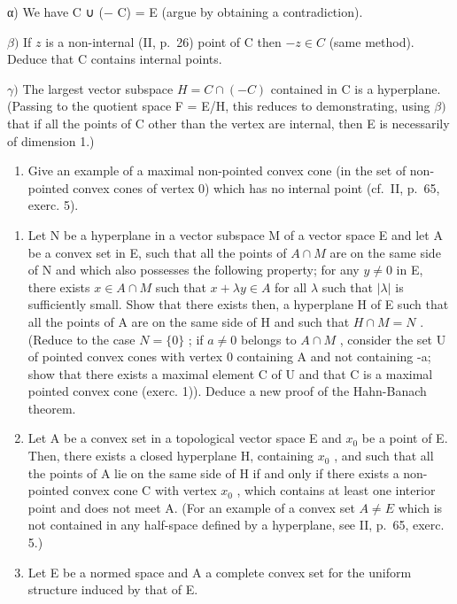 α) We have C ∪ (− C) = E (argue by obtaining a contradiction).

\(\beta)\) If \(z\) is a non-internal (II, p.~26) point of C then \(-z \in C\) (same method). Deduce that C contains internal points.

\(\gamma)\) The largest vector subspace \(H = C \cap (-C)\) contained in C is a hyperplane. (Passing to the quotient space F = E/H, this reduces to demonstrating, using \(\beta)\) that if all the points of C other than the vertex are internal, then E is necessarily of dimension 1.)

\begin{enumerate}
\def\labelenumi{\alph{enumi})}
\setcounter{enumi}{1}
\tightlist
\item
  Give an example of a maximal non-pointed convex cone (in the set of non-pointed convex cones of vertex 0) which has no internal point (cf.~II, p.~65, exerc. 5).
\end{enumerate}

\begin{enumerate}
\def\labelenumi{\arabic{enumi})}
\setcounter{enumi}{1}
\item
  Let N be a hyperplane in a vector subspace M of a vector space E and let A be a convex set in E, such that all the points of \(A \cap M\) are on the same side of N and which also possesses the following property; for any \(y \neq 0\) in E, there exists \(x \in A \cap M\) such that \(x + \lambda y \in A\) for all \(\lambda\) such that \(|\lambda|\) is sufficiently small. Show that there exists then, a hyperplane H of E such that all the points of A are on the same side of H and such that \(H \cap M = N\) . (Reduce to the case \(N = \{0\}\) ; if \(a \neq 0\) belongs to \(A \cap M\) , consider the set U of pointed convex cones with vertex 0 containing A and not containing -a; show that there exists a maximal element C of U and that C is a maximal pointed convex cone (exerc. 1)). Deduce a new proof of the Hahn-Banach theorem.
\item
  Let A be a convex set in a topological vector space E and \(x_{0}\) be a point of E. Then, there exists a closed hyperplane H, containing \(x_{0}\) , and such that all the points of A lie on the same side of H if and only if there exists a non-pointed convex cone C with vertex \(x_{0}\) , which contains at least one interior point and does not meet A. (For an example of a convex set \(A \neq E\) which is not contained in any half-space defined by a hyperplane, see II, p.~65, exerc. 5.)
\item
  Let E be a normed space and A a complete convex set for the uniform structure induced by that of E.
\end{enumerate}

